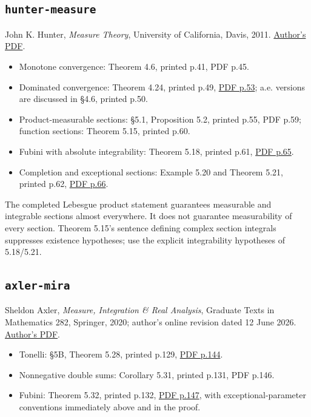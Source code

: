 \documentclass[
  11pt,
]{article}
\providecommand{\tightlist}{%
  \setlength{\itemsep}{0pt}\setlength{\parskip}{0pt}}
\begin{document}
\subsection{\texorpdfstring{\texttt{hunter-\allowbreak{}measure}}{hunter-measure}}\label{hunter-measure}

John K. Hunter, \emph{Measure Theory}, University of California, Davis,
2011.
\href{https://www.math.ucdavis.edu/~hunter/measure_theory/measure_notes.pdf}{Author's
PDF}.

\begin{itemize}
\tightlist
\item
  Monotone convergence: Theorem 4.6, printed p.41, PDF p.45.
\item
  Dominated convergence: Theorem 4.24, printed p.49,
  \href{https://www.math.ucdavis.edu/~hunter/measure_theory/measure_notes.pdf\#page=53}{PDF
  p.53}; a.e. versions are discussed in §4.6, printed p.50.
\item
  Product-measurable sections: §5.1, Proposition 5.2, printed p.55, PDF
  p.59; function sections: Theorem 5.15, printed p.60.
\item
  Fubini with absolute integrability: Theorem 5.18, printed p.61,
  \href{https://www.math.ucdavis.edu/~hunter/measure_theory/measure_notes.pdf\#page=65}{PDF
  p.65}.
\item
  Completion and exceptional sections: Example 5.20 and Theorem 5.21,
  printed p.62,
  \href{https://www.math.ucdavis.edu/~hunter/measure_theory/measure_notes.pdf\#page=66}{PDF
  p.66}.
\end{itemize}

The completed Lebesgue product statement guarantees measurable and
integrable sections almost everywhere. It does not guarantee
measurability of every section. Theorem 5.15's sentence defining complex
section integrals suppresses existence hypotheses; use the explicit
integrability hypotheses of 5.18/5.21.

\subsection{\texorpdfstring{\texttt{axler-\allowbreak{}mira}}{axler-mira}}\label{axler-mira}

Sheldon Axler, \emph{Measure, Integration \& Real Analysis}, Graduate
Texts in Mathematics 282, Springer, 2020; author's online revision dated
12 June 2026. \href{https://measure.axler.net/MIRA.pdf}{Author's PDF}.

\begin{itemize}
\tightlist
\item
  Tonelli: §5B, Theorem 5.28, printed p.129,
  \href{https://measure.axler.net/MIRA.pdf\#page=144}{PDF p.144}.
\item
  Nonnegative double sums: Corollary 5.31, printed p.131, PDF p.146.
\item
  Fubini: Theorem 5.32, printed p.132,
  \href{https://measure.axler.net/MIRA.pdf\#page=147}{PDF p.147}, with
  exceptional-parameter conventions immediately above and in the proof.
\end{itemize}
\end{document}
